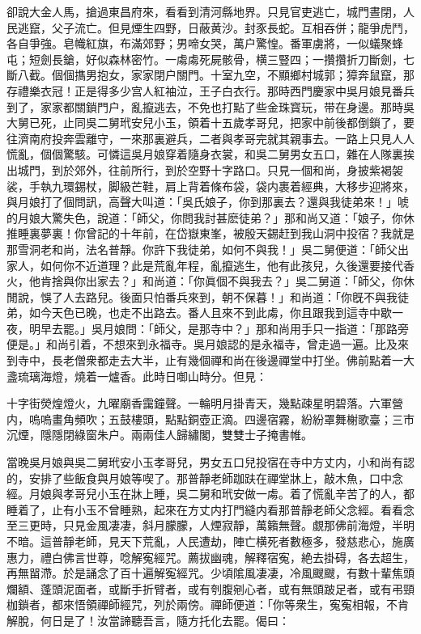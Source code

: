 卻說大金人馬，搶過東昌府來，看看到清河縣地界。只見官吏逃亡，城門晝閉，人民逃竄，父子流亡。但見煙生四野，日蔽黄沙。封豕長蛇。互相吞併；龍爭虎鬥，各自爭強。皂幟紅旗，布滿郊野；男啼女哭，萬户驚惶。番軍虜將，一似蟻聚蜂屯；短劍長鎗，好似森林密竹。一䖏䖏死屍骸骨，横三豎四；一攢攢折刀斷劍，七斷八截。個個㩦男抱女，家家閉户關門。十室九空，不顯鄉村城郭；獐奔鼠竄，那存禮樂衣冠！正是得多少宫人紅袖泣，王子白衣行。那時西門慶家中吳月娘見番兵到了，家家都關鎖門户，亂攛逃去，不免也打點了些金珠寳玩，带在身邊。那時吳大舅已死，止同吳二舅玳安兒小玉，領着十五歲孝哥兒，把家中前後都倒鎖了，要往濟南府投奔雲離守，一來那裏避兵，二者與孝哥完就其親事去。一路上只見人人慌亂，個個驚駭。可憐這吳月娘穿着隨身衣裳，和吳二舅男女五口，雜在人隊裏挨出城門，到於郊外，往前所行，到於空野十字路口。只見一個和尚，身披紫褐袈裟，手執九環錫杖，脚級芒鞋，肩上背着條布袋，袋内裹着經典，大移步迎將來，與月娘打了個問訊，高聲大叫道：「吳氏娘子，你到那裏去？還與我徒弟來！」唬的月娘大驚失色，說道：「師父，你問我討甚麽徒弟？」那和尚又道：「娘子，你休推睡裏夢裏！你曾記的十年前，在岱嶽東峯，被殷天錫赶到我山洞中投宿？我就是那雪洞老和尚，法名普靜。你許下我徒弟，如何不與我！」吳二舅便道：「師父出家人，如何你不近道理？此是荒亂年程，亂攛逃生，他有此孩兒，久後還要接代香火，他肯捨與你出家去？」和尚道：「你眞個不與我去？」吳二舅道：「師父，你休閒說，悞了人去路兒。後面只怕番兵來到，朝不保暮！」和尚道：「你旣不與我徒弟，如今天色已晚，也走不出路去。番人且來不到此䖏，你且跟我到這寺中歇一夜，明早去罷。」吳月娘問：「師父，是那寺中？」那和尚用手只一指道：「那路旁便是。」和尚引着，不想來到永福寺。吳月娘認的是永福寺，曾走過一遍。比及來到寺中，長老僧衆都走去大半，止有幾個禪和尚在後邊禪堂中打坐。佛前點着一大盞琉璃海燈，燒着一爐香。此時日啣山時分。但見：

\begin{myquote}
十字街熒煌燈火，九曜廟香靄鐘聲。一輪明月掛青天，幾點疎星明碧落。六軍營内，嗚嗚畫角頻吹；五鼓樓頭，點點銅壺正滴。四邊宿霧，紛紛罩舞榭歌臺；三市沉煙，隱隱閉綠窗朱户。兩兩佳人歸繡閣，雙雙士子掩書帷。
\end{myquote}

當晚吳月娘與吳二舅玳安小玉孝哥兒，男女五口兒投宿在寺中方丈内，小和尚有認的，安排了些飯食與月娘等喫了。那普靜老師跏趺在禪堂牀上，敲木魚，口中念經。月娘與孝哥兒小玉在牀上睡，吳二舅和玳安做一䖏。着了慌亂辛苦了的人，都睡着了，止有小玉不曾睡熟，起來在方丈内打門縫内看那普靜老師父念經。看看念至三更時，只見金風凄凄，斜月朦朦，人煙寂靜，萬籟無聲。覷那佛前海燈，半明不暗。這普靜老師，見天下荒亂，人民遭劫，陣亡横死者數極多，發慈悲心，施廣惠力，禮白佛言世尊，唸解寃經咒。薦拔幽魂，解釋宿寃，絶去掛碍，各去超生，再無㽞滯。於是誦念了百十遍解寃經咒。少頃隂風凄凄，冷風颼颼，有數十輩焦頭爛額、蓬頭泥面者，或斷手折臂者，或有刳腹剜心者，或有無頭跛足者，或有弔頸枷鎖者，都來悟領禪師經咒，列於兩傍。禪師便道：「你等衆生，寃寃相報，不肯解脫，何日是了！汝當諦聽吾言，隨方托化去罷。偈曰：

